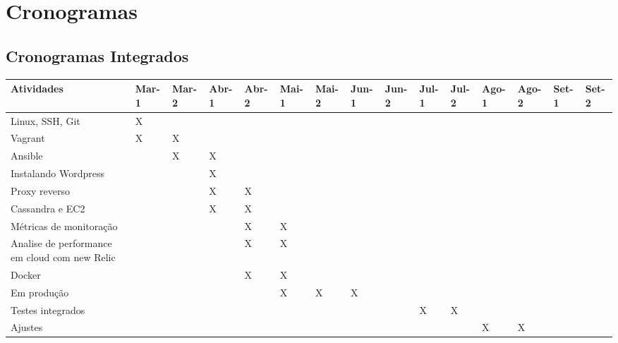 \chapter{Cronogramas}
\section{Cronogramas Integrados}

\begin{center}
\begin{tabular}{ | m{10cm} | m{0.5cm}| m{0.5cm} |
m{0.5cm} | m{0.5cm} | m{0.5cm} |m{0.5cm} |
m{0.5cm} |m{0.5cm} |m{0.5cm} |m{0.5cm} |
m{0.5cm} |m{0.5cm} |m{0.5cm} |m{0.5cm} | }

\hline
 Atividades & Mar-1 & Mar-2 & Abr-1 & Abr-2 &
              Mai-1 & Mai-2 & Jun-1 & Jun-2 &
              Jul-1 & Jul-2 & Ago-1 & Ago-2 &
              Set-1 & Set-2 \\
\hline
Linux, SSH, Git & X & & & & & & & & & & & & & \\
\hline
Vagrant & X & X & & & & & & & & & & & &  \\
\hline
Ansible &  & X & X & & & & & & & & & & &  \\
\hline
Instalando Wordpress &  & & X & & & & & & & & & & &  \\
\hline
Proxy reverso &  & & X & X & & & & & & & & & &  \\
\hline
Cassandra e EC2 &  & & X & X & & & & & & & & & & \\
\hline
Métricas de monitoração &  & & & X & X & & & & & & & & & \\
\hline
Analise de performance em cloud com new Relic &  & & & X & X & & & & & & & & & \\
\hline
Docker &  & & & X & X & & & & & & & & & \\
\hline
Em produção &  & & &  & X & X & X & & & & & & & \\
\hline
Testes integrados & & & & & & & & & X & X & & & & \\
\hline
Ajustes & & & & & & & & & & & X & X & & \\




\hline
\end{tabular}
\end{center}

